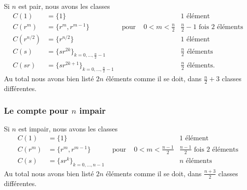 Si \( n\) est pair, nous avons les classes
\begin{subequations}
	\begin{align}
		C(1)       & =\{ 1 \}                                       &               &                   & 1\text{ élément}                               \\
		C(r^m)     & =\{ r^m,r^{m-1} \}                             & \text{ pour } & 0<m<\frac{ n }{2} & \frac{ n }{2}-1\text{ fois } 2\text{ éléments} \\
		C(r^{n/2}) & =\{ r^{n/2} \}                                 &               &                   & 1\text{ élément}                               \\
		C(s)       & =\{ sr^{2k} \}_{k=0,\ldots, \frac{ n }{2}-1}   &               &                   & \frac{ n }{2}\text{ éléments}                  \\
		C(sr)      & =\{ sr^{2k+1} \}_{k=0,\ldots, \frac{ n }{2}-1} &               &                   & \frac{ n }{2}\text{ éléments}.
	\end{align}
\end{subequations}
Au total nous avons bien listé \( 2n\) éléments comme il se doit, dans \(  \frac{ n }{2}+3\) classes différentes.

\subsubsection{Le compte pour $ n$ impair}
\label{GJIzDEP}

Si \( n\) est impair, nous avons les classes
\begin{subequations}
	\begin{align}
		C(1)   & =\{ 1 \}                      &               &                     & 1\text{ élément}                               \\
		C(r^m) & =\{ r^m,r^{m-1} \}            & \text{ pour } & 0<m<\frac{ n-1 }{2} & \frac{ n-1 }{2}\text{ fois } 2\text{ éléments} \\
		C(s)   & =\{ sr^k \}_{k=0,\ldots, n-1} &               &                     & n\text{ éléments}
	\end{align}
\end{subequations}
Au total nous avons bien listé \( 2n\) éléments comme il se doit, dans \(  \frac{ n+3 }{2}\) classes différentes.

